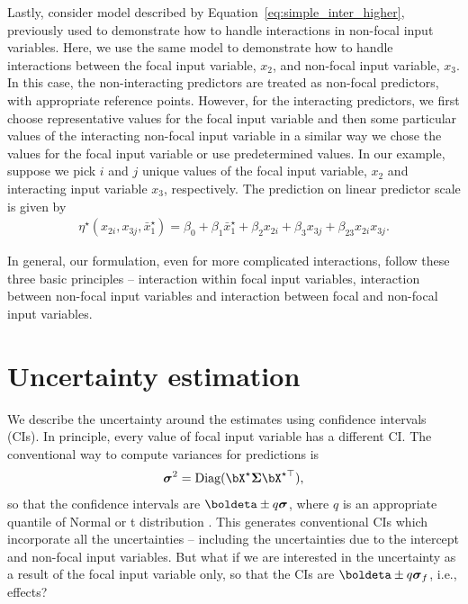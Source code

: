 %
Lastly, consider model described by Equation~\ref{eq:simple_inter_higher}, previously used to demonstrate how to handle interactions in non-focal input variables. Here, we use the same model to demonstrate how to handle interactions between the focal input variable, $x_2$, and non-focal input variable, $x_3$. In this case, the non-interacting predictors are treated as non-focal predictors, with appropriate reference points. However, for the interacting predictors, we first choose representative values for the focal input variable and then some particular values of the interacting non-focal input variable in a similar way we chose the values for the focal input variable or use predetermined values. In our example, suppose we pick $i$ and $j$ unique values of the focal input variable, $x_2$ and interacting input variable $x_3$, respectively. The prediction on linear predictor scale is given by
%
\begin{align*}
\eta^\star(x_{2i}, x_{3j}, {\bar{x}^\star_1}) = \beta_0 + \beta_1 \bar{x}^\star_1 + \beta_2x_{2i} + \beta_3x_{3j} + \beta_{23}x_{2i}x_{3j}.
\end{align*}
%

In general, our formulation, even for more complicated interactions, follow these three basic principles -- interaction within focal input variables, interaction between non-focal input variables and interaction between focal and non-focal input variables.


\section{Uncertainty estimation}

We describe the uncertainty around the estimates using confidence intervals (CIs). In principle, every value of focal input variable has a different CI. The conventional way to compute variances for predictions is 
%
\begin{align}\label{eq:conventional_variance}
\boldsymbol\sigma^2 = \textrm{Diag}(\bX^\star \boldsymbol{\Sigma} \bX^{\star\top}), 
\end{align}
so that the confidence intervals are $\boldeta \pm q\boldsymbol\sigma$, where $q$ is an appropriate quantile of Normal or t distribution \citep{lenth2018package, fox2009effect}. This generates conventional CIs which incorporate all the uncertainties -- including the uncertainties due to the intercept and non-focal input variables.  But what if we are interested in the uncertainty as a result of the focal input variable only, so that the CIs are $\boldeta \pm q \boldsymbol \sigma_f$, i.e., effects? 

